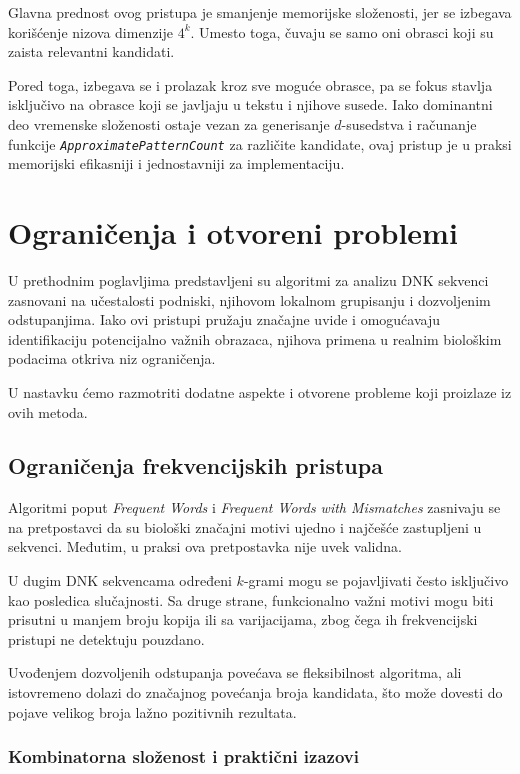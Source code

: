 \documentclass[12pt,oneside]{memoir}
\begin{document}
Glavna prednost ovog pristupa je smanjenje memorijske složenosti, jer se izbegava korišćenje nizova dimenzije $4^k$. Umesto toga, čuvaju se samo oni obrasci koji su zaista relevantni kandidati.

Pored toga, izbegava se i prolazak kroz sve moguće obrasce, pa se fokus stavlja isključivo na obrasce koji se javljaju u tekstu i njihove susede. Iako dominantni deo vremenske složenosti ostaje vezan za generisanje $d$-susedstva i računanje funkcije \textit{\texttt{ApproximatePatternCount}} za različite kandidate, ovaj pristup je u praksi memorijski efikasniji i jednostavniji za implementaciju.





\section{Ograničenja i otvoreni problemi}

U prethodnim poglavljima predstavljeni su algoritmi za analizu DNK sekvenci zasnovani na učestalosti podniski, njihovom lokalnom grupisanju i dozvoljenim odstupanjima. Iako ovi pristupi pružaju značajne uvide i omogućavaju identifikaciju potencijalno važnih obrazaca, njihova primena u realnim biološkim podacima otkriva niz ograničenja.

U nastavku ćemo razmotriti dodatne aspekte i otvorene probleme koji proizlaze iz ovih metoda.

\subsection{Ograničenja frekvencijskih pristupa}

Algoritmi poput \textit{Frequent Words} i \textit{Frequent Words with Mismatches} zasnivaju se na pretpostavci da su biološki značajni motivi ujedno i najčešće zastupljeni u sekvenci. Međutim, u praksi ova pretpostavka nije uvek validna.

U dugim DNK sekvencama određeni $k$-grami mogu se pojavljivati često isključivo kao posledica slučajnosti. Sa druge strane, funkcionalno važni motivi mogu biti prisutni u manjem broju kopija ili sa varijacijama, zbog čega ih frekvencijski pristupi ne detektuju pouzdano.

Uvođenjem dozvoljenih odstupanja povećava se fleksibilnost algoritma, ali istovremeno dolazi do značajnog povećanja broja kandidata, što može dovesti do pojave velikog broja lažno pozitivnih rezultata.

\subsubsection{Kombinatorna složenost i praktični izazovi}
\end{document}
